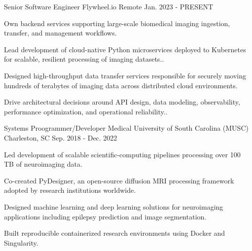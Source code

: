 

\begin{cventries}

  \cventry
    {Senior Software Engineer} %
    {Flywheel.io} %
    {Remote} %
    {Jan. 2023 - PRESENT} %
    {
      \begin{cvitems} %
        \item {Own backend services supporting large-scale biomedical imaging ingestion, transfer, and management workflows.}
        \item {Lead development of cloud-native Python microservices deployed to Kubernetes for scalable, resilient processing of imaging datasets..}
        \item {Designed high-throughput data transfer services responsible for securely moving hundreds of terabytes of imaging data across distributed cloud environments.}
        \item {Drive architectural decisions around API design, data modeling, observability, performance optimization, and operational reliability..}
      \end{cvitems}
    }

  \cventry
    {Systems Proogrammer/Developer} %
    {Medical University of South Carolina (MUSC)} %
    {Charleston, SC} %
    {Sep. 2018 - Dec. 2022} %
    {
      \begin{cvitems} %
        \item {Led development of scalable scientific-computing pipelines processing over 100 TB of neuroimaging data.}
        \item {Co-created PyDesigner, an open-source diffusion MRI processing framework adopted by research institutions worldwide.}
        \item {Designed machine learning and deep learning solutions for neuroimaging applications including epilepsy prediction and image segmentation.}
        \item {Built reproducible containerized research environments using Docker and Singularity.}
      \end{cvitems}
    }


\end{cventries}
